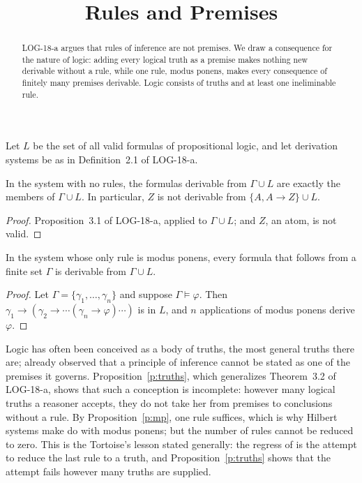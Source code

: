 \documentclass{situationist-preprint}
\title{Rules and Premises}
\begin{document}
\maketitle

\begin{abstract}
LOG-18-a argues that rules of inference are not premises. We draw a consequence for the nature of logic: adding every logical truth as a premise makes nothing new derivable without a rule, while one rule, modus ponens, makes every consequence of finitely many premises derivable. Logic consists of truths and at least one ineliminable rule.
\end{abstract}

Let $L$ be the set of all valid formulas of propositional logic, and let derivation systems be as in Definition~2.1 of LOG-18-a.

\begin{proposition}\label{p:truths}
In the system with no rules, the formulas derivable from $\Gamma \cup L$ are exactly the members of $\Gamma \cup L$. In particular, $Z$ is not derivable from $\{A, A \to Z\} \cup L$.
\end{proposition}

\begin{proof}
Proposition~3.1 of LOG-18-a, applied to $\Gamma \cup L$; and $Z$, an atom, is not valid.
\end{proof}

\begin{proposition}\label{p:mp}
In the system whose only rule is modus ponens, every formula that follows from a finite set $\Gamma$ is derivable from $\Gamma \cup L$.
\end{proposition}

\begin{proof}
Let $\Gamma = \{\gamma_1, \ldots, \gamma_n\}$ and suppose $\Gamma \models \varphi$. Then $\gamma_1 \to (\gamma_2 \to \cdots (\gamma_n \to \varphi) \cdots)$ is in $L$, and $n$ applications of modus ponens derive $\varphi$.
\end{proof}

Logic has often been conceived as a body of truths, the most general truths there are; \citet[\S 38]{Russell1903} already observed that a principle of inference cannot be stated as one of the premises it governs. Proposition~\ref{p:truths}, which generalizes Theorem~3.2 of LOG-18-a, shows that such a conception is incomplete: however many logical truths a reasoner accepts, they do not take her from premises to conclusions without a rule. By Proposition~\ref{p:mp}, one rule suffices, which is why Hilbert systems make do with modus ponens; but the number of rules cannot be reduced to zero. This is the Tortoise's lesson stated generally: the regress of \citet{Carroll1895} is the attempt to reduce the last rule to a truth, and Proposition~\ref{p:truths} shows that the attempt fails however many truths are supplied.
\end{document}
